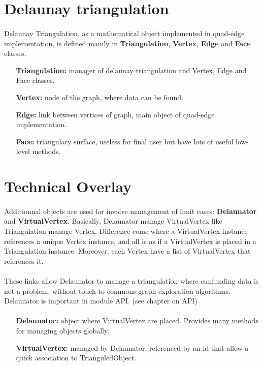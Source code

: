 \documentclass{report}
\begin{document}
\section{Delaunay triangulation}
    \paragraph*{}
    Delaunay Triangulation, as a mathematical object implemented in quad-edge implementation, is defined mainly in \textbf{Triangulation}, \textbf{Vertex}, \textbf{Edge} and \textbf{Face} classes.
    \begin{itemize}
        \item[\textbf{Triangulation:}] manager of delaunay triangulation and Vertex, Edge and Face classes.
        \item[\textbf{Vertex:}] node of the graph, where data can be found.
        \item[\textbf{Edge:}] link between vertices of graph, main object of quad-edge implementation.
        \item[\textbf{Face:}] triangulary surface, useless for final user but have lots of useful low-level methods.
    \end{itemize}



\section{Technical Overlay}
    \paragraph*{}
    Additionnal objects are used for involve management of limit cases: \textbf{Delaunator} and \textbf{VirtualVertex}.
    Basically, Delaunator manage VirtualVertex like Triangulation manage Vertex. Difference come where a VirtualVertex instance references a unique Vertex instance, and all is as if a VirtualVertex is placed in a Triangulation
    instance. Moreover, each Vertex have a list of VirtualVertex that references it. 
    \paragraph*{}
    These links allow Delaunator to manage a triangulation where cunfunding data is not a problem, without touch to commons graph exploration algorithms.
    Delaunator is important in module API. (see chapter on API)
    \paragraph*{}
    \begin{itemize}
        \item[\textbf{Delaunator:}] object where VirtualVertex are placed. Provides many methods for managing objects globally.
        \item[\textbf{VirtualVertex:}] managed by Delaunator, referenced by an id that allow a quick association to TrianguledObject.
    \end{itemize}
\end{document}
